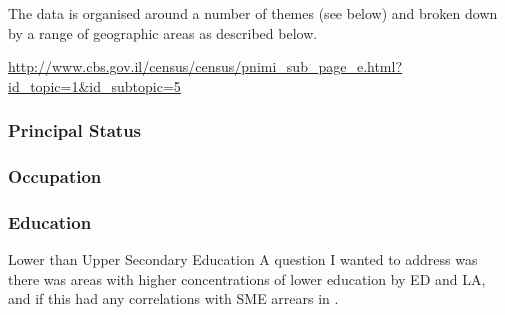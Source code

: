 The data is organised around a number of themes (see below) and broken down by a range of geographic areas as
described below.

\url{http://www.cbs.gov.il/census/census/pnimi_sub_page_e.html?id_topic=1&id_subtopic=5}

\subsubsection{Principal Status}

\subsubsection{Occupation}
\subsubsection{Education}
Lower than Upper Secondary Education
A question I wanted to address was there was areas with higher concentrations of lower education by ED and LA, and if this had any correlations with SME arrears in \subjectname.

